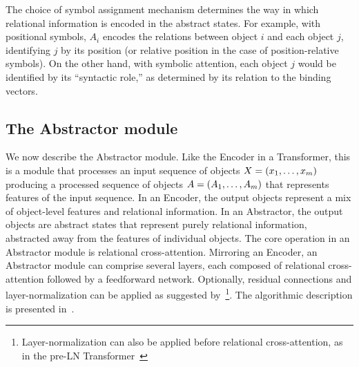 

The choice of symbol assignment mechanism determines the way in which relational information is encoded in the abstract states. For example, with positional symbols, $A_i$ encodes the relations between object $i$ and each object $j$, identifying $j$ by its position (or relative position in the case of position-relative symbols). On the other hand, with symbolic attention, each object $j$ would be identified by its ``syntactic role,'' as determined by its relation to the binding vectors.

\subsection{The Abstractor module}\label{ssec:abstractor_module}

We now describe the Abstractor module. Like the Encoder in a Transformer, this is a module that processes an input sequence of objects $X = \left(x_1, \ldots, x_m\right)$ producing a processed sequence of objects $A = \left(A_1, \ldots, A_m\right)$ that represents features of the input sequence. In an Encoder, the output objects represent a mix of object-level features and relational information. In an Abstractor, the output objects are abstract states that represent purely relational information, abstracted away from the features of individual objects. The core operation in an Abstractor module is relational cross-attention. Mirroring an Encoder, an Abstractor module can comprise several layers, each composed of relational cross-attention followed by a feedforward network. Optionally, residual connections and layer-normalization can be applied as suggested by~\citet{vaswani2017attention}\footnote{Layer-normalization can also be applied before relational cross-attention, as in the pre-LN Transformer~\citep{xiong2020layer}}. The algorithmic description is presented in~.

